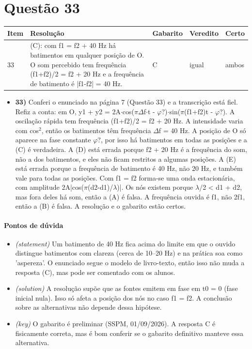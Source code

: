 \documentclass{article}%
\begin{document}
\section*{Questão 33}%
\begin{longtable}{@{}p{} p{} p{} p{} p{}@{}}\toprule Item & Resolução & Gabarito & Veredito & Certo \\ \midrule
33 & (C): com f1 = f2 + 40 Hz há batimentos em qualquer posição de O. O som percebido tem frequência (f1+f2)/2 = f2 + 20 Hz e a frequência de batimento é |f1-f2| = 40 Hz. & C & igual & ambos \\
\bottomrule\end{longtable}%
\begin{itemize}%
\item%
\textbf{33)} Conferi o enunciado na página 7 (Questão 33) e a transcrição está fiel. Refiz a conta: em O, y1 + y2 = 2A$\cdot$cos($\pi$$\Delta$f$\cdot$t - $\varphi$?)$\cdot$sin($\pi$(f1+f2)t - $\varphi$?). A oscilação rápida tem frequência (f1+f2)/2 = f2 + 20 Hz. A intensidade varia com cos$^2$, então os batimentos têm frequência $\Delta$f = 40 Hz. A posição de O só aparece na fase constante $\varphi$?, por isso há batimentos em todas as posições e a (C) é verdadeira. A (D) está errada porque f2 + 20 Hz é a frequência do som, não a dos batimentos, e eles não ficam restritos a algumas posições. A (E) está errada porque a frequência de batimento é 40 Hz, não 20 Hz, e também vale para todas as posições. Com f1 = f2 forma{-}se uma onda estacionária, com amplitude 2A|cos($\pi$(d2-d1)/$\lambda$)|. Os nós existem porque $\lambda$/2 < d1 + d2, mas fora deles há som, então a (A) é falsa. A frequência ouvida é f1, não 2f1, então a (B) é falsa. A resolução e o gabarito estão certos.%
\end{itemize}%
\paragraph{Pontos de dúvida}%
\begin{itemize}%
\item%
\textit{(statement)} Um batimento de 40 Hz fica acima do limite em que o ouvido distingue batimentos com clareza (cerca de 10--20 Hz) e na prática soa como 'aspereza'. O enunciado segue o modelo de livro{-}texto, então isso não muda a resposta (C), mas pode ser comentado com os alunos.%
\item%
\textit{(solution)} A resolução supõe que as fontes emitem em fase em t0 = 0 (fase inicial nula). Isso só afeta a posição dos nós no caso f1 = f2. A conclusão sobre as alternativas não depende dessa hipótese.%
\item%
\textit{(key)} O gabarito é preliminar (SSPM, 01/09/2026). A resposta C é fisicamente correta, mas é bom conferir se o gabarito definitivo manteve essa alternativa.%
\end{itemize}%
\end{document}

